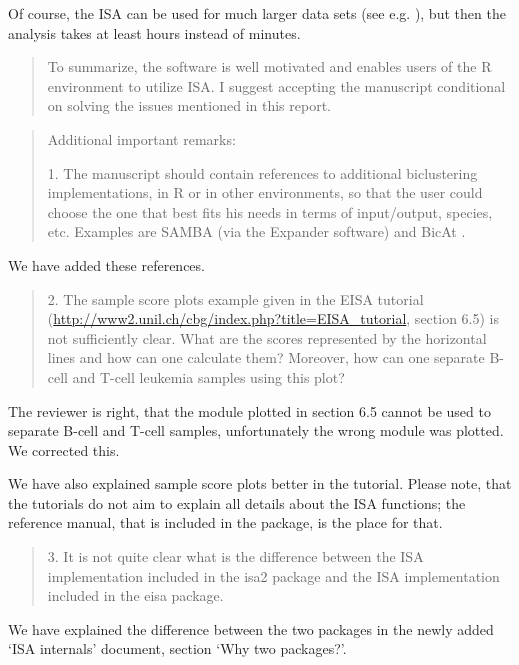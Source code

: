 \documentclass[a4paper]{article}
\begin{document}
Of course, the ISA can be used for much larger data sets (see
e.g. \cite{bergmann04}), but then the analysis takes at least hours
instead of minutes.

\begin{quote}
To summarize, the software is well motivated and enables users of the
R environment to utilize ISA. I suggest accepting the manuscript
conditional on solving the issues mentioned in this report. 
\end{quote}

\begin{quote}
Additional important remarks:

1.      The manuscript should contain references to additional
biclustering implementations, in R or in other environments, so that
the user could choose the one that best fits his needs in terms of
input/output, species, etc. Examples are SAMBA (via the Expander
software) \citep{sharan02,tanay04} and BicAt \citep{barkow06}. 
\end{quote}

We have added these references.

\begin{quote}
2.      The sample score plots example given in the EISA tutorial
(\url{http://www2.unil.ch/cbg/index.php?title=EISA\_tutorial}, section 6.5)
is not sufficiently clear. What are the scores represented by the
horizontal lines and how can one calculate them? Moreover, how can one
separate B-cell and T-cell leukemia samples using this plot? 
\end{quote}

The reviewer is right, that the module plotted in section 6.5 cannot
be used to separate B-cell and T-cell samples, unfortunately the wrong
module was plotted. We corrected this.

We have also explained sample score plots better in the tutorial. 
Please note, that the tutorials do not aim to explain all details 
about the ISA functions; the reference manual, that is included in the
package, is the place for that.

\begin{quote}
3.      It is not quite clear what is the difference between the ISA
implementation included in the isa2 package and the ISA implementation
included in the eisa package. 
\end{quote}

We have explained the difference between the two packages in the newly
added `ISA internals' document, section `Why two packages?'.
\end{document}
